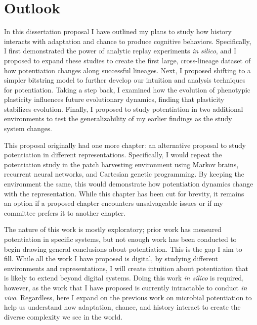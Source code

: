 \section{Outlook}

In this dissertation proposal I have outlined my plans to study how history interacts with adaptation and chance to produce cognitive behaviors. 
Specifically, I first demonstrated the power of analytic replay experiments \textit{in silico}, and I proposed to expand these studies to create the first large, cross-lineage dataset of how potentiation changes along successful lineages. 
Next, I proposed shifting to a simpler bitstring model to further develop our intuition and analysis techniques for potentiation. 
Taking a step back, I examined how the evolution of phenotypic plasticity influences future evolutionary dynamics, finding that plasticity stabilizes evolution. 
Finally, I proposed to study potentiation in two additional environments to test the generalizability of my earlier findings as the study system changes. 

This proposal originally had one more chapter: an alternative proposal to study potentiation in different representations. 
Specifically, I would repeat the potentiation study in the patch harvesting environment using Markov brains, recurrent neural networks, and Cartesian genetic programming. 
By keeping the environment the same, this would demonstrate how potentiation dynamics change with the representation.  
While this chapter has been cut for brevity, it remains an option if a proposed chapter encounters unsalvageable issues or if my committee prefers it to another chapter. 

The nature of this work is mostly exploratory; prior work has measured potentiation in specific systems, but not enough work has been conducted to begin drawing general conclusions about potentiation. 
This is the gap I aim to fill. 
While all the work I have proposed is digital, by studying different environments and representations, I will create intuition about potentiation that is likely to extend beyond digital systems.
Doing this work \textit{in silico} is required, however, as the work that I have proposed is currently intractable to conduct \textit{in vivo}.
Regardless, here I expand on the previous work on microbial potentiation to help us understand how adaptation, chance, and history interact to create the diverse complexity we see in the world. 

